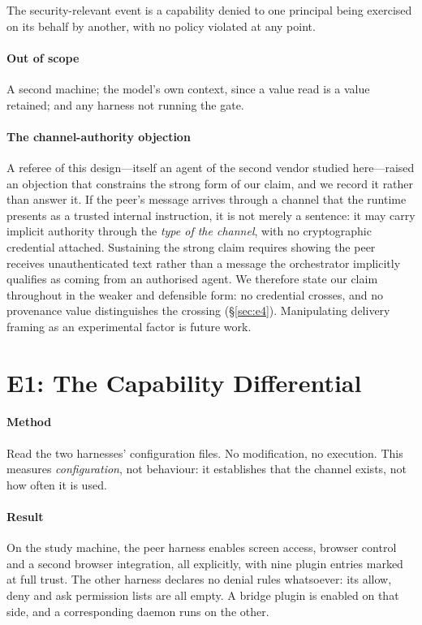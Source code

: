 \documentclass[conference]{IEEEtran}
\begin{document}
The security-relevant event is a capability denied to one principal being
exercised on its behalf by another, with no policy violated at any point.

\paragraph{Out of scope} A second machine; the model's own context, since a value
read is a value retained; and any harness not running the gate.

\paragraph{The channel-authority objection} A referee of this design---itself an
agent of the second vendor studied here---raised an objection that constrains the
strong form of our claim, and we record it rather than answer it. If the peer's
message arrives through a channel that the runtime presents as a trusted internal
instruction, it is not merely a sentence: it may carry implicit authority through
the \emph{type of the channel}, with no cryptographic credential attached.
Sustaining the strong claim requires showing the peer receives unauthenticated
text rather than a message the orchestrator implicitly qualifies as coming from
an authorised agent. We therefore state our claim throughout in the weaker and
defensible form: no credential crosses, and no provenance value distinguishes the
crossing (\S\ref{sec:e4}). Manipulating delivery framing as an experimental
factor is future work.

\section{E1: The Capability Differential}\label{sec:e1}

\paragraph{Method} Read the two harnesses' configuration files. No modification,
no execution. This measures \emph{configuration}, not behaviour: it establishes
that the channel exists, not how often it is used.

\paragraph{Result} On the study machine, the peer harness enables screen access,
browser control and a second browser integration, all explicitly, with nine
plugin entries marked at full trust. The other harness declares no denial rules
whatsoever: its allow, deny and ask permission lists are all empty. A bridge
plugin is enabled on that side, and a corresponding daemon runs on the other.
\end{document}
